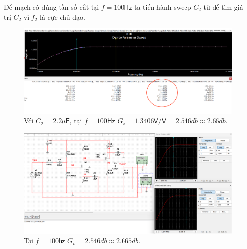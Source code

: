 Để mạch có đúng tần số cắt tại $f = 100 \textsf{Hz}$ ta tiến hành sweep $C_{2}$ từ để tìm giá trị $C_{2}$ vì $f_{2}$ là cực chủ đạo.

\begin{figure}[H]
	\centering
	\includegraphics[width=.9\linewidth]{./my-chapters/my-images/Question8/d_ketqua2.png}
	\caption{Với $C_{2} = 2.2 \mu\textsf{F}$, tại $f = 100 \textsf{Hz}$ $G_{v} = 1.3406 \textsf{V/V} = 2.546db \approx 2.66db$.}
\end{figure}

\begin{figure}[H]
	\centering
	\includegraphics[width=.9\linewidth]{./my-chapters/my-images/Question8/d_ketqua3.png}
	\caption{Tại $f = 100 \textsf{hz}$ $G_{v} = 2.546 db \approx 2.665 db$.}
\end{figure}